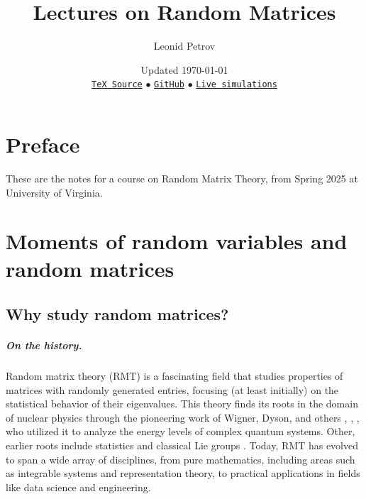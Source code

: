 \documentclass[letterpaper,11pt,oneside,reqno]{book}
\numberwithin{equation}{chapter}  %
\theoremstyle{definition}
\begin{document}
\title{Lectures on Random Matrices}
\author{Leonid Petrov}
\date{Updated \today\\
\href{https://lpetrov.cc/rmt25/S25-rmt-lecture-notes/S25-rmt-lecture-notes.tex}{\texttt{TeX Source}} $\bullet$
\href{https://github.com/lenis2000/homepage/blob/master/rmt25/S25-rmt-lecture-notes/S25-rmt-lecture-notes.tex}{\texttt{GitHub}} $\bullet$ \href{https://lpetrov.cc/simulations/model/random-matrices/}{\texttt{Live simulations}}}
\maketitle
\setcounter{tocdepth}{1}
\tableofcontents
\setcounter{tocdepth}{4}

\chapter*{Preface}

These are the notes for a course on Random Matrix Theory,
from Spring 2025 at University of Virginia.




\chapter{Moments of random variables and random
matrices}
\label{chap:lecture1}



\section{Why study random matrices?}




\paragraph{On the history.}
Random matrix theory (RMT) is a fascinating field that
studies
properties of matrices with randomly generated entries,
focusing (at least initially)
on the statistical behavior of their eigenvalues.
This theory finds its roots in the domain of nuclear
physics through the pioneering work of Wigner, Dyson, and
others \cite{wigner1955characteristic},
\cite{dyson1962brownian},
\cite{Dyson1962_III}, who utilized it to analyze the energy levels of complex quantum systems.
Other, earlier roots include statistics \cite{dixon1905generalization}
and classical Lie groups \cite{Hurwitz1897}.
Today, RMT has evolved to span a wide array of disciplines,
from pure mathematics, including areas such as integrable
systems and representation theory, to practical applications
in fields like data science and engineering.
\end{document}
